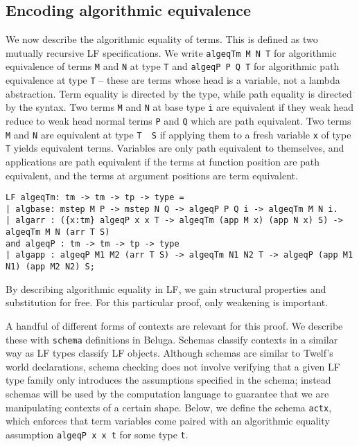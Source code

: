 \documentclass[copyright,creativecommons]{eptcs}
\begin{document}
\subsection{Encoding algorithmic equivalence}
We now describe the algorithmic equality of terms. This is defined
as two mutually recursive LF specifications. We write
\lstinline{algeqTm M N T}
for algorithmic equivalence of terms \lstinline{M} and \lstinline{N} at
type \lstinline{T} and 
\lstinline{algeqP P Q T} for algorithmic path equivalence at type
\lstinline{T} -- these are terms whose head is a variable, not a lambda abstraction. Term equality is directed by the type,
while path equality is directed by the syntax. Two terms \lstinline{M}
and \lstinline{N} at base type \lstinline{i} are equivalent if they weak head reduce to weak head normal
terms \lstinline{P} and \lstinline{Q} which are path equivalent. Two
terms \lstinline{M} and \lstinline{N} are equivalent at type
\lstinline{T  S} if applying them to a fresh variable
\lstinline{x} of type \lstinline{T} yields equivalent terms. Variables are only path equivalent to
themselves, and applications are path equivalent if the terms at
function position are path equivalent, and the terms at argument
positions are term equivalent. 

\begin{lstlisting}
LF algeqTm: tm -> tm -> tp -> type = 
| algbase: mstep M P -> mstep N Q -> algeqP P Q i -> algeqTm M N i.
| algarr : ({x:tm} algeqP x x T -> algeqTm (app M x) (app N x) S) -> algeqTm M N (arr T S)
and algeqP : tm -> tm -> tp -> type
| algapp : algeqP M1 M2 (arr T S) -> algeqTm N1 N2 T -> algeqP (app M1 N1) (app M2 N2) S;
\end{lstlisting}

By describing algorithmic equality in LF, we gain structural
properties and substitution for free. For this particular proof, only weakening
is important.

A handful of different forms of contexts are relevant for this proof. We describe these
with \lstinline{schema} definitions in Beluga. Schemas classify contexts in a
similar way as LF types classify LF objects. Although schemas are
similar to Twelf's world declarations, schema checking does 
not involve verifying that a given LF type family only introduces the
assumptions specified in the schema; instead schemas will be used by the
computation language to guarantee that we are manipulating contexts of a certain
shape. Below, we define the schema \lstinline{actx}, which enforces that term
variables come paired with an algorithmic equality assumption
\lstinline{algeqP x x t} for some type \lstinline{t}.
\end{document}
